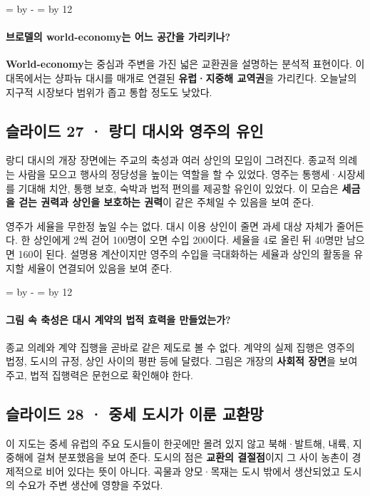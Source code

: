 \documentclass[10pt,a4paper]{article}
\newcommand{\ReserveQuestionSpace}{%
  \par\begingroup
  \dimen0=\pagegoal \advance\dimen0 by -\pagetotal
  \dimen2=\baselineskip \multiply\dimen2 by 12
  \ifdim\dimen0<\dimen2 \newpage\fi
  \endgroup}
\begin{document}
\ReserveQuestionSpace
\paragraph{브로델의 world-economy는 어느 공간을 가리키나?}
\textbf{World-economy}는 중심과 주변을 가진 넓은 교환권을 설명하는 분석적 표현이다. 이 대목에서는 샹파뉴 대시를 매개로 연결된 \textbf{유럽·지중해 교역권}을 가리킨다. 오늘날의 지구적 시장보다 범위가 좁고 통합 정도도 낮았다.\par

\subsection{슬라이드 27 · 랑디 대시와 영주의 유인}
랑디 대시의 개장 장면에는 주교의 축성과 여러 상인의 모임이 그려진다. 종교적 의례는 사람을 모으고 행사의 정당성을 높이는 역할을 할 수 있었다. 영주는 통행세·시장세를 기대해 치안, 통행 보호, 숙박과 법적 편의를 제공할 유인이 있었다. 이 모습은 \textbf{세금을 걷는 권력과 상인을 보호하는 권력}이 같은 주체일 수 있음을 보여 준다.\par

영주가 세율을 무한정 높일 수는 없다. 대시 이용 상인이 줄면 과세 대상 자체가 줄어든다. 한 상인에게 2씩 걷어 100명이 오면 수입 200이다. 세율을 4로 올린 뒤 40명만 남으면 160이 된다. 설명용 계산이지만 영주의 수입을 극대화하는 세율과 상인의 활동을 유지할 세율이 연결되어 있음을 보여 준다.\par

\ReserveQuestionSpace
\paragraph{그림 속 축성은 대시 계약의 법적 효력을 만들었는가?}
종교 의례와 계약 집행을 곧바로 같은 제도로 볼 수 없다. 계약의 실제 집행은 영주의 법정, 도시의 규정, 상인 사이의 평판 등에 달렸다. 그림은 개장의 \textbf{사회적 장면}을 보여 주고, 법적 집행력은 문헌으로 확인해야 한다.\par

\subsection{슬라이드 28 · 중세 도시가 이룬 교환망}
이 지도는 중세 유럽의 주요 도시들이 한곳에만 몰려 있지 않고 북해·발트해, 내륙, 지중해에 걸쳐 분포했음을 보여 준다. 도시의 점은 \textbf{교환의 결절점}이지 그 사이 농촌이 경제적으로 비어 있다는 뜻이 아니다. 곡물과 양모·목재는 도시 밖에서 생산되었고 도시의 수요가 주변 생산에 영향을 주었다.\par
\end{document}
